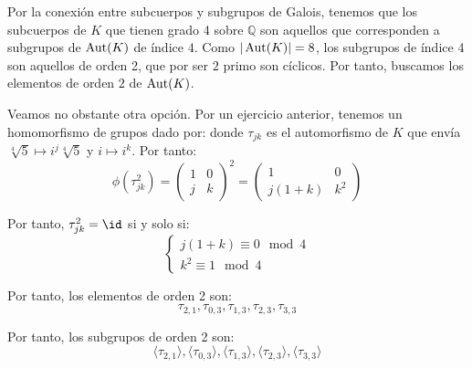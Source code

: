 \begin{ejercicio}
\begin{enumerate}
        Por la conexión entre subcuerpos y subgrupos de Galois, tenemos que los subcuerpos de $K$ que tienen grado 4 sobre $\mathbb{Q}$ son aquellos que corresponden a subgrupos de $\operatorname{Aut}(K)$ de índice $4$. Como $|\operatorname{Aut}(K)| = 8$, los subgrupos de índice 4 son aquellos de orden 2, que por ser $2$ primo son cíclicos. Por tanto, buscamos los elementos de orden $2$ de $\operatorname{Aut}(K)$.


        Veamos no obstante otra opción. Por un ejercicio anterior, tenemos un homomorfismo de grupos dado por:
        donde $\tau_{jk}$ es el automorfismo de $K$ que envía $\sqrt[4]{5}\mapsto i^j\sqrt[4]{5}$ y $i\mapsto i^k$. Por tanto:
        \begin{equation*}
            \phi(\tau_{jk}^2) = \left(\begin{array}{cc}
                1 & 0 \\
                j & k
            \end{array}\right)^2 = \left(\begin{array}{cc}
                1 & 0 \\
                j(1+k) & k^2
            \end{array}\right)
        \end{equation*}

        Por tanto, $\tau_{jk}^2 = \id$ si y solo si:
        \begin{equation*}
            \begin{cases}
                j(1+k) \equiv 0 \mod 4 \\
                k^2 \equiv 1 \mod 4
            \end{cases}
        \end{equation*}

        Por tanto, los elementos de orden 2 son:
        \begin{equation*}
            \tau_{2,1}, \tau_{0,3}, \tau_{1,3}, \tau_{2,3}, \tau_{3,3}
        \end{equation*}

        Por tanto, los subgrupos de orden 2 son:
        \begin{equation*}
            \langle \tau_{2,1} \rangle, \langle \tau_{0,3} \rangle, \langle \tau_{1,3} \rangle, \langle \tau_{2,3} \rangle, \langle \tau_{3,3} \rangle
        \end{equation*}
        

\end{enumerate}
\end{ejercicio}
